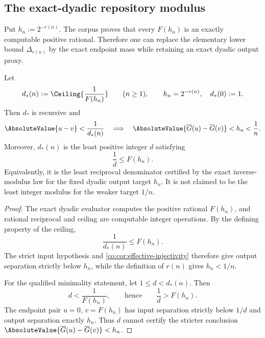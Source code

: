 \subsection{The exact-dyadic repository modulus}

Put $h_n:=2^{-r(n)}$.  The corpus proves that every $F(h_n)$ is an exactly
computable positive rational.  Therefore one can replace the elementary lower
bound $\Delta_{r(n)}$ by the exact endpoint mass while retaining an exact
dyadic output proxy.

\begin{proposition}\label{co:prop:exact-dyadic-modulus}
Let
\begin{equation}\label{co:eq:d-star}
 d_*(n):=
 \Ceiling{\frac{1}{F(h_n)}}
 \qquad(n\ge1),
 \qquad h_n=2^{-r(n)},
 \quad d_*(0):=1.
\end{equation}
Then $d_*$ is recursive and
\begin{equation}\label{co:eq:d-star-strong}
 \AbsoluteValue{u-v}<\frac1{d_*(n)}
 \quad\Longrightarrow\quad
 \AbsoluteValue{\InvT(u)-\InvT(v)}<h_n<\frac1n.
\end{equation}
Moreover, $d_*(n)$ is the least positive integer $d$ satisfying
\[
 \frac1d\le F(h_n).
\]
Equivalently, it is the least reciprocal denominator certified by the exact
inverse-modulus law for the fixed dyadic output target $h_n$.  It is not
claimed to be the least integer modulus for the weaker target $1/n$.
\end{proposition}

\begin{proof}
The exact dyadic evaluator computes the positive rational $F(h_n)$, and
rational reciprocal and ceiling are computable integer operations.  By the
defining property of the ceiling,
\[
 \frac1{d_*(n)}\le F(h_n).
\]
The strict input hypothesis and \cref{co:cor:effective-injectivity} therefore
give output separation strictly below $h_n$, while the definition of $r(n)$
gives $h_n<1/n$.

For the qualified minimality statement, let $1\le d<d_*(n)$.  Then
\[
 d<\frac1{F(h_n)},
 \qquad\text{hence}\qquad
 \frac1d>F(h_n).
\]
The endpoint pair $u=0$, $v=F(h_n)$ has input separation strictly below
$1/d$ and output separation exactly $h_n$.  Thus $d$ cannot certify the
stricter conclusion $\AbsoluteValue{\InvT(u)-\InvT(v)}<h_n$.
\end{proof}

